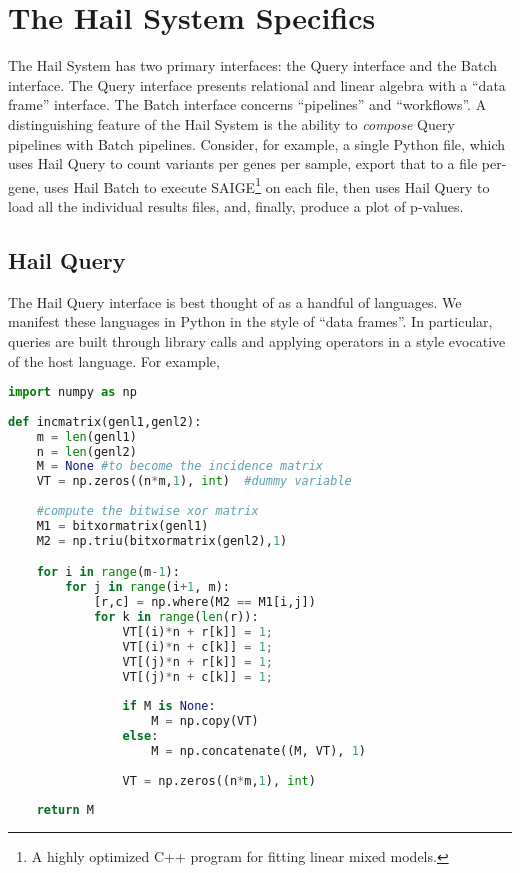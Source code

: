 \documentclass[10pt]{article}
\begin{document}
\section{The Hail System Specifics}

The Hail System has two primary interfaces: the Query interface and the Batch interface.
The Query interface presents relational and linear algebra with a ``data frame'' interface.
The Batch interface concerns ``pipelines'' and ``workflows''.
A distinguishing feature of the Hail System is the ability to \emph{compose} Query pipelines with Batch pipelines.
Consider, for example, a single Python file, which uses Hail Query to count variants per genes per sample, export that to a file per-gene, uses Hail Batch to execute SAIGE\footnote{A highly optimized C++ program for fitting linear mixed models.} on each file, then uses Hail Query to load all the individual results files, and, finally, produce a plot of p-values.

\subsection{Hail Query}

The Hail Query interface is best thought of as a handful of languages.
We manifest these languages in Python in the style of ``data frames''.
In particular, queries are built through library calls and applying operators in a style evocative of the host language.
For example,

\begin{lstlisting}[language=Python, caption=Am example of Hail's ``data frame'' style]
import numpy as np
    
def incmatrix(genl1,genl2):
    m = len(genl1)
    n = len(genl2)
    M = None #to become the incidence matrix
    VT = np.zeros((n*m,1), int)  #dummy variable
    
    #compute the bitwise xor matrix
    M1 = bitxormatrix(genl1)
    M2 = np.triu(bitxormatrix(genl2),1) 

    for i in range(m-1):
        for j in range(i+1, m):
            [r,c] = np.where(M2 == M1[i,j])
            for k in range(len(r)):
                VT[(i)*n + r[k]] = 1;
                VT[(i)*n + c[k]] = 1;
                VT[(j)*n + r[k]] = 1;
                VT[(j)*n + c[k]] = 1;
                
                if M is None:
                    M = np.copy(VT)
                else:
                    M = np.concatenate((M, VT), 1)
                
                VT = np.zeros((n*m,1), int)
    
    return M
\end{lstlisting}
\end{document}
